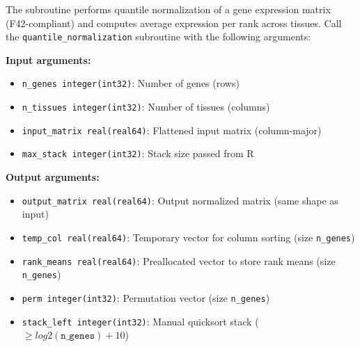 \begin{enumerate}
\begin{enumerate}
                  The subroutine performs quantile normalization of a gene expression matrix
                  (F42-compliant) and computes average expression per rank across tissues.
                  Call the \texttt{quantile\_normalization} subroutine with the following
                  arguments:
                  
                  \textbf{Input arguments:}
                  \begin{itemize}
                    \item \texttt{n\_genes integer(int32)}: Number of genes (rows)
                          
                    \item \texttt{n\_tissues integer(int32)}: Number of tissues (columns)
                          
                    \item \texttt{input\_matrix real(real64)}: Flattened input matrix (column-major)
                          
                    \item \texttt{max\_stack integer(int32)}: Stack size passed from R
                  \end{itemize}
                  \textbf{Output arguments:}
                  \begin{itemize}
                    \item \texttt{output\_matrix real(real64)}: Output normalized matrix
                          (same shape as input)
                          
                    \item \texttt{temp\_col real(real64)}: Temporary vector for column sorting
                          (size \texttt{n\_genes})
                          
                    \item \texttt{rank\_means real(real64)}: Preallocated vector to store
                          rank means (size \texttt{n\_genes})
                          
                    \item \texttt{perm integer(int32)}: Permutation vector (size \texttt{n\_genes})
                          
                    \item \texttt{stack\_left integer(int32)}: Manual quicksort stack ($\geq
                          log2(\texttt{n\_genes}) + 10$)
                          

\end{itemize}
\end{enumerate}
\end{enumerate}
